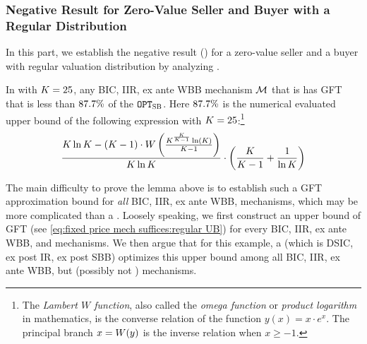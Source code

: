 \subsubsection{Negative Result for Zero-Value Seller and Buyer with a Regular Distribution}

In this part, we establish the negative result () for a zero-value seller and a buyer with regular valuation distribution by analyzing .

\begin{lemma}
    \label{lem:GFT UB:regular buyer}
    In  with $K = 25$, any BIC, IIR, ex ante WBB mechanism $\mathcal{M}$ that is {\ksfair} has GFT that is less than ${87.7\%}$ of the {\SecondBest} $\texttt{OPT}_{\textsc{SB}}$. Here ${87.7\%}$ is the numerical evaluated upper bound of the following expression with $K = 25$:\footnote{The \emph{Lambert $W$ function}, also called the \emph{omega function} or \emph{product logarithm} in mathematics, is the converse relation of the function $y(x) = x\cdot e^x$. The principal branch $x = W(y)$ is the inverse relation when $x \geq -1$.} 
    \begin{align*}
    \frac{K\ln K- (K - 1)\cdot W\left(\frac{K^{\frac{K}{K - 1}}\ln (K)}{K-1}\right)}{K\ln K}\cdot \left(\frac{K}{K - 1}+\frac{1}{\ln K}\right)
    \end{align*}
\end{lemma} 
The main difficulty to prove the lemma above is to establish such a GFT approximation bound for \emph{all} BIC, IIR, ex ante WBB, {\ksfair} mechanisms, which may be more complicated than a {\ksfair} {\FixPrice}. Loosely speaking, we first construct an upper bound of GFT (see \eqref{eq:fixed price mech suffices:regular UB}) for every BIC, IIR, ex ante WBB, and {\ksfair} mechanisms. We then argue that for this example, a {\ksfair} {\FixPrice} (which is DSIC, ex post IR, ex post SBB) optimizes this upper bound among all BIC, IIR, ex ante WBB, but (possibly not {\ksfair}) mechanisms. 


